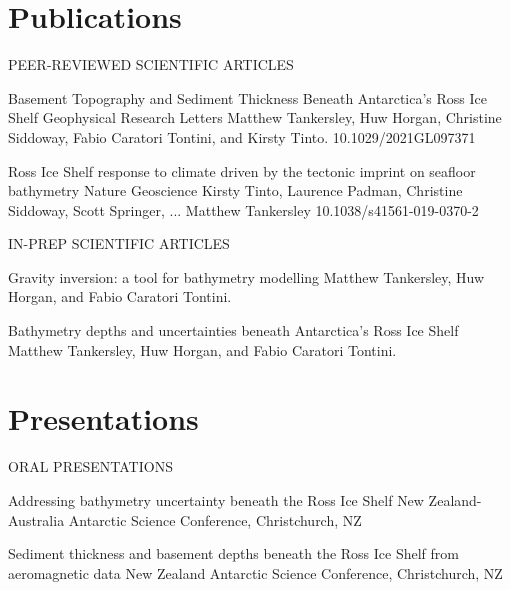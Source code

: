 \documentclass{ExpressiveResume}
\begin{document}
\section{Publications}
\noindent PEER-REVIEWED SCIENTIFIC ARTICLES \newline
\begin{cventries}
    {Basement Topography and Sediment Thickness Beneath Antarctica’s Ross Ice Shelf}
    {Geophysical Research Letters}
    {Matthew Tankersley, Huw Horgan, Christine Siddoway, Fabio Caratori Tontini, and Kirsty Tinto.}
    {10.1029/2021GL097371}

    {Ross Ice Shelf response to climate driven by the tectonic
        imprint on seafloor bathymetry}
    {Nature Geoscience}
    {Kirsty Tinto, Laurence Padman, Christine Siddoway, Scott Springer, ... Matthew Tankersley}
    {10.1038/s41561-019-0370-2}
\end{cventries}


\noindent IN-PREP SCIENTIFIC ARTICLES \newline
\begin{cventries}
    {Gravity inversion: a tool for bathymetry modelling}
    {Matthew Tankersley, Huw Horgan, and Fabio Caratori Tontini.}

    {Bathymetry depths and uncertainties beneath Antarctica's Ross Ice Shelf}
    {Matthew Tankersley, Huw Horgan, and Fabio Caratori Tontini.}

\end{cventries}


\section{Presentations}
\noindent ORAL PRESENTATIONS \newline
\begin{cventries}
    {Addressing bathymetry uncertainty beneath the Ross Ice Shelf}
    {New Zealand-Australia Antarctic Science Conference, Christchurch, NZ}
    {}
    {}

    {Sediment thickness and basement depths beneath the Ross Ice Shelf from aeromagnetic data}
    {New Zealand Antarctic Science Conference, Christchurch, NZ}
    {}
    {}

\end{cventries}
\end{document}
